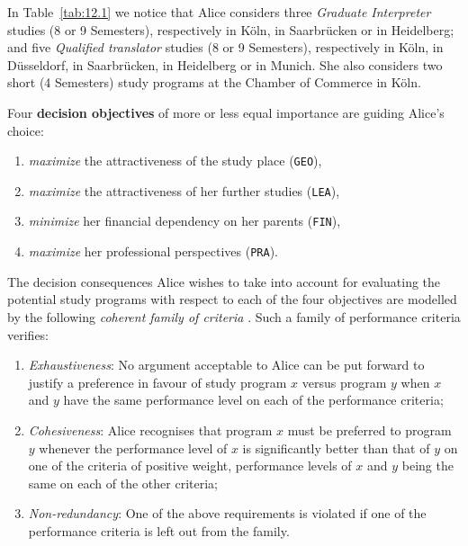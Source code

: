 In Table~\vref{tab:12.1} we notice that Alice considers three \emph{Graduate Interpreter} studies (8 or 9 Semesters), respectively in Köln, in Saarbrücken or in Heidelberg; and five \emph{Qualified translator} studies (8 or 9 Semesters), respectively in Köln, in Düsseldorf, in Saarbrücken, in Heidelberg or in Munich. She also considers two short (4 Semesters) study programs at the Chamber of Commerce in Köln. 

Four \textbf{decision objectives} of more or less equal importance are guiding Alice's choice:
\begin{enumerate}[leftmargin=1cm,topsep=1pt]
\item \emph{maximize} the attractiveness of the study place (\texttt{GEO}),
\item \emph{maximize} the attractiveness of her further studies (\texttt{LEA}),
\item \emph{minimize}  her financial dependency on her parents (\texttt{FIN}),
\item \emph{maximize} her professional perspectives (\texttt{PRA}).
\end{enumerate}

The decision consequences Alice wishes to take into account for evaluating the potential study programs with respect to each of the four objectives are modelled by the following \emph{coherent family of criteria} \citep*{ROY-1991,ROY-1993}. Such a family of performance criteria verifies:
\begin{enumerate}[topsep=1pt]
\item \emph{Exhaustiveness}: No argument acceptable to Alice can be put forward to justify a preference in favour of study program $x$ versus program $y$  when $x$ and $y$ have the same performance level on each of the performance criteria;
\item \emph{Cohesiveness}: Alice recognises that program $x$ must be preferred to program $y$ whenever the performance level of $x$ is significantly better than that of $y$ on one of the criteria of positive weight, performance levels of $x$ and $y$ being the same on each of the other criteria; 
\item \emph{Non-redundancy}: One of the above requirements is violated if one of the performance criteria is left out from the family.
\end{enumerate}

